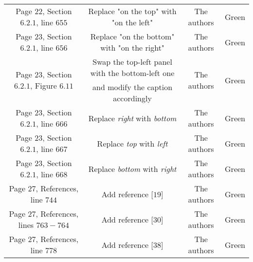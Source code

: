 \documentclass[longtitle]{elsarticle}
\theoremstyle{theorem}
\theoremstyle{definition}
\theoremstyle{remark}
\theoremstyle{proposition}
\numberwithin{figure}{section}
\begin{document}
\begin{longtable}{c|c|c|c}
		\cline{1-4}
		\multicolumn{1}{|c|}{Page $22$, Section $6.2.1$, line $655$} & 
		\multicolumn{1}{c|}{Replace "on the top" with "on the left"} &
		\multicolumn{1}{c|}{The authors} &
		\multicolumn{1}{c|}{\textcolor{deepgreen}{Green}} \\
		\cline{1-4}
		\multicolumn{1}{|c|}{Page $23$, Section $6.2.1$, line $656$} & 
		\multicolumn{1}{c|}{Replace "on the bottom" with "on the right"} &
		\multicolumn{1}{c|}{The authors} &
		\multicolumn{1}{c|}{\textcolor{deepgreen}{Green}} \\
		\cline{1-4}
		\multicolumn{1}{|c|}{\multirow{2}{*}{Page $23$, Section $6.2.1$, Figure $6.11$}} & 
		\multicolumn{1}{c|}{Swap the top-left panel with the bottom-left one} &
		\multicolumn{1}{c|}{\multirow{2}{*}{The authors}} &
		\multicolumn{1}{c|}{\multirow{2}{*}{\textcolor{deepgreen}{Green}}} \\[-0.1cm]
		\multicolumn{1}{|c|}{} &
		\multicolumn{1}{c|}{and modify the caption accordingly} &
		\multicolumn{1}{c|}{} &
		\multicolumn{1}{c|}{} \\[0.1cm]
		\cline{1-4}
		\multicolumn{1}{|c|}{Page $23$, Section $6.2.1$, line $666$} & 
		\multicolumn{1}{c|}{Replace \emph{right} with \emph{bottom}} &
		\multicolumn{1}{c|}{The authors} &
		\multicolumn{1}{c|}{\textcolor{deepgreen}{Green}} \\
		\cline{1-4}
		\multicolumn{1}{|c|}{Page $23$, Section $6.2.1$, line $667$} & 
		\multicolumn{1}{c|}{Replace \emph{top} with \emph{left}} &
		\multicolumn{1}{c|}{The authors} &
		\multicolumn{1}{c|}{\textcolor{deepgreen}{Green}} \\
		\cline{1-4}
		\multicolumn{1}{|c|}{Page $23$, Section $6.2.1$, line $668$} & 
		\multicolumn{1}{c|}{Replace \emph{bottom} with \emph{right}} &
		\multicolumn{1}{c|}{The authors} &
		\multicolumn{1}{c|}{\textcolor{deepgreen}{Green}} \\
		\cline{1-4}
		\multicolumn{1}{|c|}{Page $27$, References, line $744$} & 
		\multicolumn{1}{c|}{Add reference [$19$]} &
		\multicolumn{1}{c|}{The authors} &
		\multicolumn{1}{c|}{\textcolor{deepgreen}{Green}} \\
		\cline{1-4}
		\multicolumn{1}{|c|}{Page $27$, References, lines $763-764$} & 
		\multicolumn{1}{c|}{Add reference [$30$]} &
		\multicolumn{1}{c|}{The authors} &
		\multicolumn{1}{c|}{\textcolor{deepgreen}{Green}} \\
		\cline{1-4}
		\multicolumn{1}{|c|}{Page $27$, References, line $778$} & 
		\multicolumn{1}{c|}{Add reference [$38$]} &
		\multicolumn{1}{c|}{The authors} &
		\multicolumn{1}{c|}{\textcolor{deepgreen}{Green}} \\
		\cline{1-4}

	\end{longtable}
\end{document}
